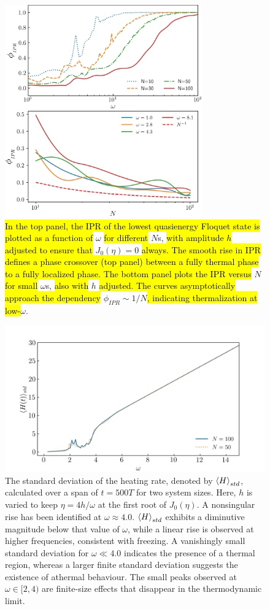 \documentclass[%
reprint,
superscriptaddress,
linenumbers,
amsmath,amssymb,
aps,
prb,
showkeys,
]{revtex4-2}
\begin{document}
	\begin{figure}[!ht]
		\centering
		\includegraphics[width =8.5cm]{phase_crossover_LMG.jpeg}
		\caption{\hl{In the top panel, the IPR of the lowest quasienergy Floquet state is plotted as a function of} $\omega$ \hl{for different} $N$s,\hl{ with amplitude $h$ adjusted to ensure that} $J_0(\eta)=0$ \hl{always. The smooth rise in IPR defines a phase crossover (top panel) between a fully thermal phase to a fully localized phase. The bottom panel plots the IPR versus} $N$ \hl{for small} $\omega$s, \hl{also with} $h$ \hl{adjusted. The curves asymptotically approach the dependency} $\phi_{IPR}\sim 1/N$\hl{, indicating thermalization at low-}$\omega$.}
		\label{fig:phase_crossover}
	\end{figure}
	\begin{figure}[!ht]
	\centering
	\includegraphics[width = 9.cm]{hbar_avg_std.jpeg}
	\caption{The standard deviation of the heating rate, denoted by $\expval{H}_{std}$, calculated over a span of $t=500 T$ for two system sizes. Here, $h$ is varied to keep $\eta = 4h/\omega$ at the first root of $J_0(\eta)$. A nonsingular rise has been identified at $\omega \approx 4.0$. $\expval{H}_{std}$ exhibits a diminutive magnitude below that value of $\omega$, while a linear rise is observed at higher frequencies, consistent with freezing. A vanishingly small standard deviation for $\omega \ll 4.0$ indicates the presence of a thermal region, whereas a larger finite standard deviation suggests the existence of athermal behaviour. The small peaks observed at $\omega\in [2, 4)$ are finite-size effects that disappear in the thermodynamic limit.}
	\label{fig:havg_std}
	\end{figure}
	
\end{document}
